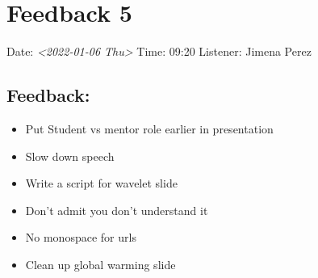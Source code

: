 \documentclass[little]{basic}
\begin{document}
\section{Feedback 5}
\label{sec:org4ee2cd0}

Date: \textit{<2022-01-06 Thu>}
Time: 09:20
Listener: Jimena Perez
\subsection*{Feedback:}
\label{sec:orgcae29f9}
\begin{itemize}
\item Put Student vs mentor role earlier in presentation
\item Slow down speech
\item Write a script for wavelet slide
\item Don't admit you don't understand it
\item No monospace for urls
\item Clean up global warming slide
\end{itemize}
\end{document}
